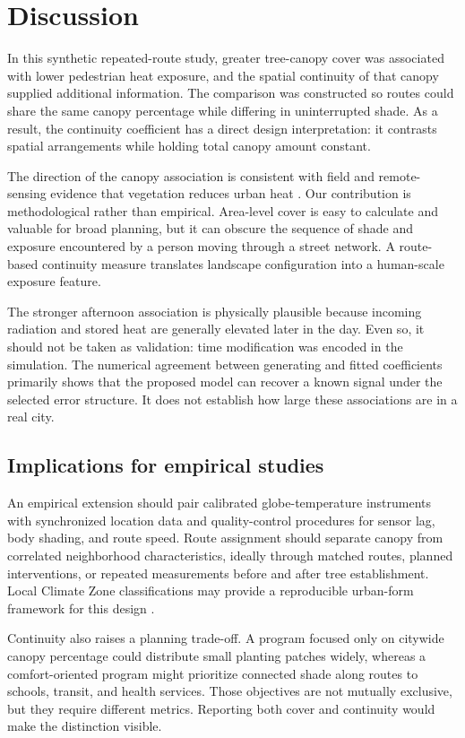 \section{Discussion}
In this synthetic repeated-route study, greater tree-canopy cover was associated with lower pedestrian heat exposure, and the spatial continuity of that canopy supplied additional information. The comparison was constructed so routes could share the same canopy percentage while differing in uninterrupted shade. As a result, the continuity coefficient has a direct design interpretation: it contrasts spatial arrangements while holding total canopy amount constant.

The direction of the canopy association is consistent with field and remote-sensing evidence that vegetation reduces urban heat \cite{Bowler2010,Armson2012,Ziter2019}. Our contribution is methodological rather than empirical. Area-level cover is easy to calculate and valuable for broad planning, but it can obscure the sequence of shade and exposure encountered by a person moving through a street network. A route-based continuity measure translates landscape configuration into a human-scale exposure feature.

The stronger afternoon association is physically plausible because incoming radiation and stored heat are generally elevated later in the day. Even so, it should not be taken as validation: time modification was encoded in the simulation. The numerical agreement between generating and fitted coefficients primarily shows that the proposed model can recover a known signal under the selected error structure. It does not establish how large these associations are in a real city.

\subsection{Implications for empirical studies}
An empirical extension should pair calibrated globe-temperature instruments with synchronized location data and quality-control procedures for sensor lag, body shading, and route speed. Route assignment should separate canopy from correlated neighborhood characteristics, ideally through matched routes, planned interventions, or repeated measurements before and after tree establishment. Local Climate Zone classifications may provide a reproducible urban-form framework for this design \cite{Stewart2012}.

Continuity also raises a planning trade-off. A program focused only on citywide canopy percentage could distribute small planting patches widely, whereas a comfort-oriented program might prioritize connected shade along routes to schools, transit, and health services. Those objectives are not mutually exclusive, but they require different metrics. Reporting both cover and continuity would make the distinction visible.

